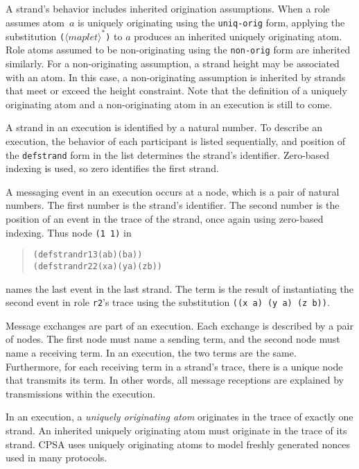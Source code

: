 \documentclass[12pt]{article}
\newcommand{\nterm}[1]{\ensuremath{\langle\mathit{#1}\rangle}}
\newcommand{\nterms}[1]{\ensuremath{\nterm{#1}^\ast}}
\begin{document}
A strand's behavior includes inherited origination assumptions.  When
a role assumes atom~$a$ is uniquely originating using the
\texttt{uniq-orig} form, applying the substitution
\texttt{(\nterms{maplet})} to $a$ produces an inherited uniquely
originating atom.  Role atoms assumed to be non-originating using the
\texttt{non-orig} form are inherited similarly.  For a non-originating
assumption, a strand height may be associated with an atom.  In this
case, a non-originating assumption is inherited by strands that meet
or exceed the height constraint.  Note that the definition of a
uniquely originating atom and a non-originating atom in an execution
is still to come.

A strand in an execution is identified by a natural number.  To
describe an execution, the behavior of each participant is listed
sequentially, and position of the \texttt{defstrand} form in the list
determines the strand's identifier.  Zero-based indexing is used,
so zero identifies the first strand.

A messaging event in an execution occurs at a node, which is a pair of
natural numbers.  The first number is the strand's identifier.  The
second number is the position of an event in the trace of the
strand, once again using zero-based indexing.  Thus node \texttt{(1~1)}
in
\begin{quote}
\begin{alltt}
(defstrand r1 3 (a b) (b a))
(defstrand r2 2 (x a) (y a) (z b))
\end{alltt}
\end{quote}
names the last event in the last strand.  The term is the
result of instantiating the second event in role \texttt{r2}'s
trace using the substitution \texttt{((x a) (y a) (z b))}.

Message exchanges are part of an execution.  Each exchange is
described by a pair of nodes.  The first node must name a sending
term, and the second node must name a receiving term.  In an
execution, the two terms are the same.  Furthermore, for each
receiving term in a strand's trace, there is a unique node that
transmits its term.  In other words, all message receptions are
explained by transmissions within the execution.

In an execution, a \emph{uniquely originating atom} originates in the
trace of exactly one strand.  An inherited uniquely originating atom
must originate in the trace of its strand.  CPSA uses uniquely
originating atoms to model freshly generated nonces used in many
protocols.
\end{document}
